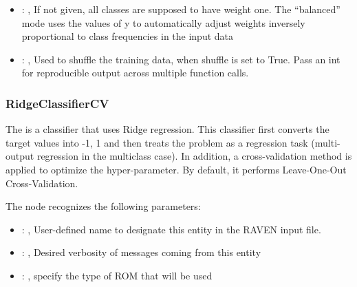 \begin{itemize}
    \item {}: \xmlDesc{[balanced]}, 
      If not given, all classes are supposed to have weight one.
      The “balanced” mode uses the values of y to automatically adjust weights
      inversely proportional to class frequencies in the input data

    \item {}: , 
      Used to shuffle the training data, when shuffle is set to
      True. Pass an int for reproducible output across multiple function calls.
  \end{itemize}


\subsubsection{RidgeClassifierCV}
  The  is a classifier that uses Ridge regression.
  This classifier first converts the target values into {-1, 1} and then treats
  the problem as a regression task (multi-output regression in the multiclass case).
  In addition, a cross-validation method is applied to optimize the hyper-parameter.
  By default, it performs Leave-One-Out Cross-Validation.

  The  node recognizes the following parameters:
    \begin{itemize}
      \item {}: , 
        User-defined name to designate this entity in the RAVEN input file.
      \item {}: , 
        Desired verbosity of messages coming from this entity
      \item {}: , 
        specify the type of ROM that will be used
  \end{itemize}


